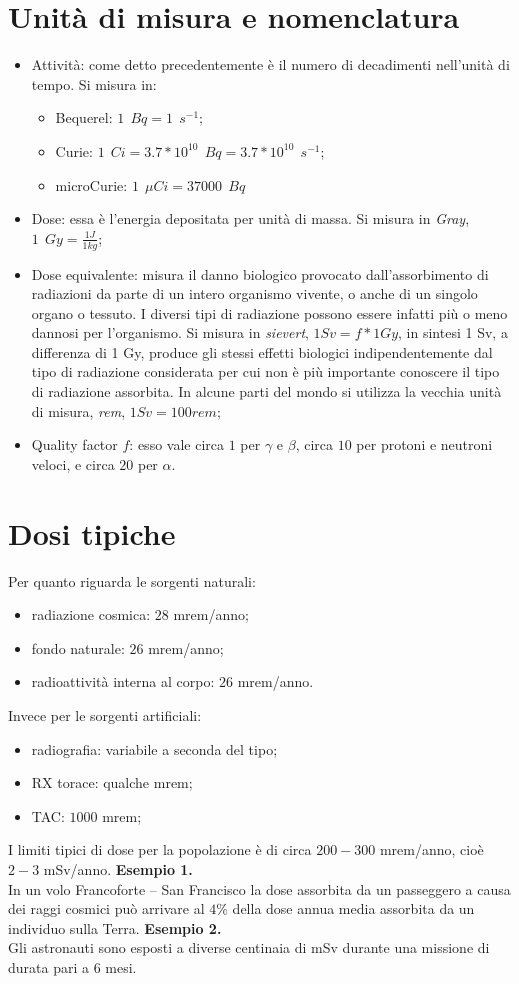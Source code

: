 \documentclass[12pt, letterpaper]{book}
\begin{document}
\section{Unità di misura e nomenclatura}
\begin{itemize}
    \item Attività: come detto precedentemente è il numero di decadimenti nell'unità di tempo. Si misura in:
    \begin{itemize}
        \item Bequerel: $1~~ Bq=1~~s^{-1}$;
        \item Curie: $1~~Ci=3.7*10^{10}~~Bq=3.7*10^{10}~~s^{-1}$;
        \item microCurie: $1~~\mu Ci= 37000~~Bq$
    \end{itemize}
    \item Dose: essa è l'energia depositata per unità di massa. Si misura in \textit{Gray}, $1~~Gy=\frac{1J}{1kg}$;
    \item Dose equivalente: misura il danno biologico provocato dall'assorbimento di radiazioni da parte di un intero organismo vivente, o anche di un singolo organo o tessuto. I diversi tipi di radiazione possono essere infatti più o meno dannosi per l'organismo. Si misura in \textit{sievert}, $1Sv=f*1Gy$, in sintesi 1 Sv, a differenza di 1 Gy, produce gli stessi effetti biologici indipendentemente dal tipo di radiazione considerata per cui non è più importante conoscere il tipo di radiazione assorbita. In alcune parti del mondo si utilizza la vecchia unità di misura, \textit{rem}, $1Sv=100rem$;
    \item Quality factor $f$: esso vale circa $1$ per $\gamma$ e $\beta$, circa $10$ per protoni e neutroni veloci, e circa $20$ per $\alpha$.
\end{itemize}
\section{Dosi tipiche}
Per quanto riguarda le sorgenti naturali:
\begin{itemize}
    \item radiazione cosmica: $28$ mrem/anno;
    \item fondo naturale: $26$ mrem/anno;
    \item radioattività interna al corpo: $26$ mrem/anno.
\end{itemize}
Invece per le sorgenti artificiali:
\begin{itemize}
    \item radiografia: variabile a seconda del tipo;
    \item RX torace: qualche mrem;
    \item TAC: $1000$ mrem;
\end{itemize}
I limiti tipici di dose per la popolazione è di circa $200-300$ mrem/anno, cioè $2-3$ mSv/anno.
\textbf{Esempio 1.}\\
In un volo Francoforte – San 
Francisco la dose assorbita da un passeggero a causa dei raggi cosmici può arrivare al $4\%$ della dose annua media assorbita da un individuo sulla Terra.
\textbf{Esempio 2.}\\
Gli astronauti sono esposti a diverse centinaia di mSv durante una missione di durata pari a 6 mesi.
\end{document}
